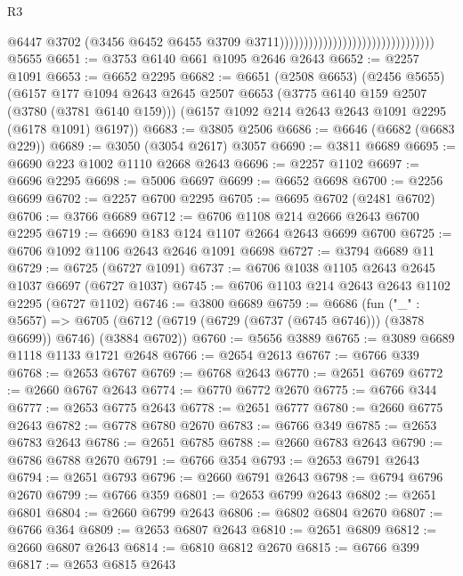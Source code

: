 \begin{lexlean}{R3}
\begin{coremodule}
                                                                  @6447
                                                                  @3702
                                                                  (@3456
                                                                    @6452
                                                                    @6455
                                                                    @3709
                                                                    @3711))))))))))))))))))))))))))))))))
    @5655
@6651 := @3753 @6140 @661 @1095 @2646 @2643
@6652 := @2257 @1091
@6653 := @6652 @2295
@6682 := @6651
    (@2508 @6653)
    (@2456 @5655)
    (@6157
      @177
      @1094
      @2643
      @2645
      @2507
      @6653
      (@3775 @6140 @159 @2507 (@3780 (@3781 @6140 @159)))
      (@6157 @1092 @214 @2643 @2643 @1091 @2295 (@6178 @1091) @6197))
@6683 := @3805 @2506
@6686 := @6646 (@6682 (@6683 @229))
@6689 := @3050 (@3054 @2617) @3057
@6690 := @3811 @6689
@6695 := @6690 @223 @1002 @1110 @2668 @2643
@6696 := @2257 @1102
@6697 := @6696 @2295
@6698 := @5006 @6697
@6699 := @6652 @6698
@6700 := @2256 @6699
@6702 := @2257 @6700 @2295
@6705 := @6695 @6702 (@2481 @6702)
@6706 := @3766 @6689
@6712 := @6706 @1108 @214 @2666 @2643 @6700 @2295
@6719 := @6690 @183 @124 @1107 @2664 @2643 @6699 @6700
@6725 := @6706 @1092 @1106 @2643 @2646 @1091 @6698
@6727 := @3794 @6689 @11
@6729 := @6725 (@6727 @1091)
@6737 := @6706 @1038 @1105 @2643 @2645 @1037 @6697 (@6727 @1037)
@6745 := @6706 @1103 @214 @2643 @2643 @1102 @2295 (@6727 @1102)
@6746 := @3800 @6689
@6759 := @6686
    (fun ("_" : @5657) =>
    @6705 (@6712 (@6719 (@6729 (@6737 (@6745 @6746))) (@3878 @6699)) @6746) (@3884 @6702))
@6760 := @5656 @3889
@6765 := @3089 @6689 @1118 @1133 @1721 @2648
@6766 := @2654 @2613
@6767 := @6766 @339
@6768 := @2653 @6767
@6769 := @6768 @2643
@6770 := @2651 @6769
@6772 := @2660 @6767 @2643
@6774 := @6770 @6772 @2670
@6775 := @6766 @344
@6777 := @2653 @6775 @2643
@6778 := @2651 @6777
@6780 := @2660 @6775 @2643
@6782 := @6778 @6780 @2670
@6783 := @6766 @349
@6785 := @2653 @6783 @2643
@6786 := @2651 @6785
@6788 := @2660 @6783 @2643
@6790 := @6786 @6788 @2670
@6791 := @6766 @354
@6793 := @2653 @6791 @2643
@6794 := @2651 @6793
@6796 := @2660 @6791 @2643
@6798 := @6794 @6796 @2670
@6799 := @6766 @359
@6801 := @2653 @6799 @2643
@6802 := @2651 @6801
@6804 := @2660 @6799 @2643
@6806 := @6802 @6804 @2670
@6807 := @6766 @364
@6809 := @2653 @6807 @2643
@6810 := @2651 @6809
@6812 := @2660 @6807 @2643
@6814 := @6810 @6812 @2670
@6815 := @6766 @399
@6817 := @2653 @6815 @2643

\end{coremodule}
\end{lexlean}
